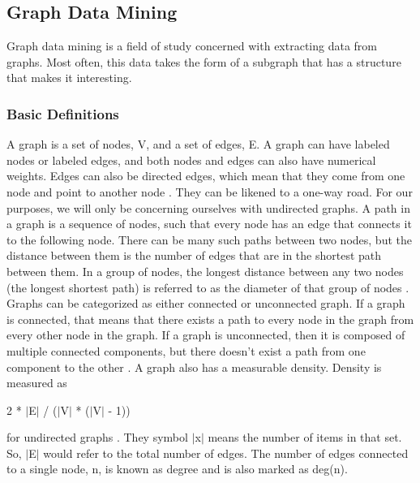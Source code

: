 \documentclass[12pt]{article}
\begin{document}
\subsection{Graph Data Mining}
Graph data mining is a field of study concerned with extracting data from graphs. Most often, this data takes the form of a subgraph that has a structure that makes it interesting.

\subsubsection{Basic Definitions}
A graph is a set of nodes, V, and a set of edges, E. A graph can have labeled nodes or labeled edges, and both nodes and edges can also have numerical weights. Edges can also be directed edges, which mean that they come from one node and point to another node \cite{survey}. They can be likened to a one-way road. For our purposes, we will only be concerning ourselves with undirected graphs.
\newline\newline
A path in a graph is a sequence of nodes, such that every node has an edge that connects it to the following node. There can be many such paths between two nodes, but the distance between them is the number of edges that are in the shortest path between them. In a group of nodes, the longest distance between any two nodes (the longest shortest path) is referred to as the diameter of that group of nodes \cite{survey}.
\newline\newline
Graphs can be categorized as either connected or unconnected graph. If a graph is connected, that means that there exists a path to every node in the graph from every other node in the graph. If a graph is unconnected, then it is composed of multiple connected components, but there doesn't exist a path from one component to the other \cite{survey}.
\newline\newline
A graph also has a measurable density. Density is measured as
\newline\newline
\centerline{2 * $\vert$E$\vert$ / ($\vert$V$\vert$ * ($\vert$V$\vert$ - 1))}
\newline\newline
for undirected graphs \cite{survey}. They symbol $\vert$x$\vert$ means the number of items in that set. So, $\vert$E$\vert$ would refer to the total number of edges. The number of edges connected to a single node, n, is known as degree and is also marked as deg(n).
\end{document}
